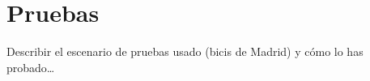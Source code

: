 \chapter{Pruebas}

Describir el escenario de pruebas usado (bicis de Madrid) y cómo lo has probado\dots